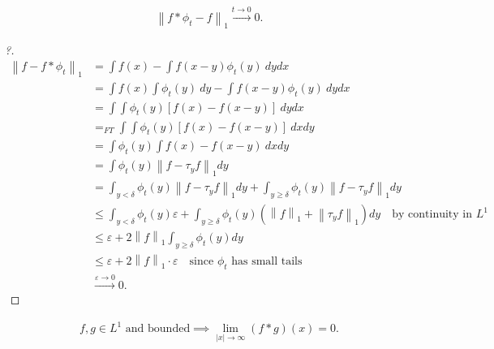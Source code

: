 \begin{theorem}

\begin{align*}
{\left\lVert {f \ast \phi_{t} - f} \right\rVert}_{1} \overset{t\to 0}\to 0
.\end{align*}

\end{theorem}

\begin{proof}[?]

\begin{align*}
{\left\lVert {f - f\ast \phi_{t}} \right\rVert}_1 
&= \int f(x) - \int f(x-y)\phi_{t}(y) ~dy dx \\
&= \int f(x)\int \phi_{t}(y) ~dy - \int f(x-y)\phi_{t}(y) ~dy dx \\
&= \int \int \phi_{t}(y)[f(x) - f(x-y)] ~dy dx \\
&=_{FT} \int \int \phi_{t}(y)[f(x) - f(x-y)] ~dx dy \\
&= \int \phi_{t}(y) \int f(x) - f(x-y) ~dx dy \\
&= \int \phi_{t}(y) {\left\lVert {f - \tau_{y} f} \right\rVert}_1 dy \\
&= \int_{y < \delta} \phi_{t}(y) {\left\lVert {f - \tau_{y} f} \right\rVert}_1 dy  +
\int_{y \geq \delta} \phi_{t}(y) {\left\lVert {f - \tau_{y} f} \right\rVert}_1 dy \\
&\leq \int_{y < \delta} \phi_{t}(y) \varepsilon +
\int_{y \geq \delta} \phi_{t}(y) \left( {\left\lVert {f} \right\rVert}_1 + {\left\lVert {\tau_{y} f} \right\rVert}_1 \right) dy \quad\text{by continuity in } L^1 \\
&\leq \varepsilon + 
2{\left\lVert {f} \right\rVert}_1 \int_{y \geq \delta} \phi_{t}(y) dy \\
&\leq \varepsilon + 2{\left\lVert {f} \right\rVert}_1 \cdot \varepsilon \quad\text{since $\phi_{t}$ has small tails} \\
&\overset{\varepsilon\to 0}\to 0 
.\end{align*}

\end{proof}

\begin{theorem}

\begin{align*}
f,g \in L^1 \text{ and  bounded}  \implies \lim_{|x| \rightarrow \infty} (f * g)(x) = 0
.\end{align*}

\end{theorem}

